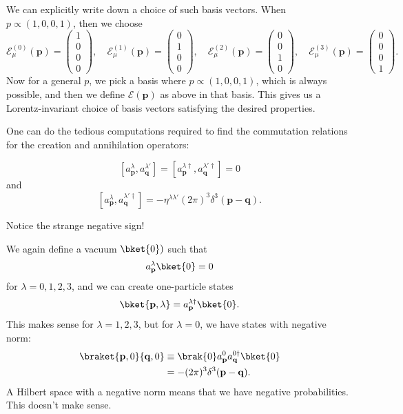 \documentclass[a4paper]{article}
\begin{document}
We can explicitly write down a choice of such basis vectors. When $p \propto (1, 0, 0, 1)$, then we choose
\[
  \mathcal{E}^{(0)}_\mu(\mathbf{p}) =
  \begin{pmatrix}
    1\\0\\0\\0
  \end{pmatrix},\quad
  \mathcal{E}^{(1)}_\mu(\mathbf{p}) =
  \begin{pmatrix}
    0\\1\\0\\0
  \end{pmatrix},\quad
  \mathcal{E}^{(2)}_\mu(\mathbf{p}) =
  \begin{pmatrix}
    0\\0\\1\\0
  \end{pmatrix},\quad
  \mathcal{E}^{(3)}_\mu(\mathbf{p}) =
  \begin{pmatrix}
    0\\0\\0\\1
  \end{pmatrix}.
\]
Now for a general $p$, we pick a basis where $p \propto (1, 0, 0, 1)$, which is always possible, and then we define $\mathcal{E}(\mathbf{p})$ as above in that basis. This gives us a Lorentz-invariant choice of basis vectors satisfying the desired properties.

One can do the tedious computations required to find the commutation relations for the creation and annihilation operators:
\begin{thm}
  \[
    [a_\mathbf{p}^\lambda, a_\mathbf{q}^{\lambda'}] = [a_\mathbf{p}^{\lambda\dagger}, a_\mathbf{q}^{\lambda'\dagger}] = 0
  \]
  and
  \[
    [a_\mathbf{p}^\lambda, a_\mathbf{q}^{\lambda' \dagger}] = -\eta^{\lambda\lambda'} (2\pi)^3 \delta^3(\mathbf{p} - \mathbf{q}).
  \]
\end{thm}
Notice the strange negative sign!

We again define a vacuum $\bket{0})$ such that
\[
  a_\mathbf{p}^\lambda \bket{0} = 0
\]
for $\lambda = 0, 1, 2, 3$, and we can create one-particle states
\[
  \bket{\mathbf{p}, \lambda} = a_\mathbf{p}^{\lambda\dagger} \bket{0}.
\]
This makes sense for $\lambda = 1, 2, 3$, but for $\lambda = 0$, we have states with negative norm:
\begin{align*}
  \braket{\mathbf{p}, 0}{\mathbf{q}, 0} &\equiv \brak{0} a_\mathbf{p}^0 a_\mathbf{q}^{0\dagger}\bket{0}\\
  &= -(2\pi)^3 \delta^3(\mathbf{p} - \mathbf{q}).
\end{align*}
A Hilbert space with a negative norm means that we have negative probabilities. This doesn't make sense.
\end{document}
